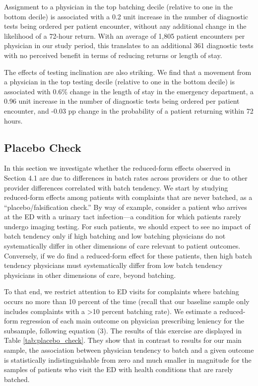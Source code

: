 \documentclass[,,nonblindrev]{informs}
\begin{document}
Assignment to a physician in the top batching decile (relative to one in
the bottom decile) is associated with a 0.2 unit increase in the number
of diagnostic tests being ordered per patient encounter, without any
additional change in the likelihood of a 72-hour return. With an average
of 1,805 patient encounters per physician in our study period, this
translates to an additional 361 diagnostic tests with no perceived
benefit in terms of reducing returns or length of stay.

The effects of testing inclination are also striking. We find that a
movement from a physician in the top testing decile (relative to one in
the bottom decile) is associated with 0.6\% change in the length of stay
in the emergency department, a 0.96 unit increase in the number of
diagnostic tests being ordered per patient encounter, and -0.03 pp
change in the probability of a patient returning within 72 hours.

\hypertarget{placebo-check}{%
\subsection{Placebo Check}\label{placebo-check}}

In this section we investigate whether the reduced-form effects observed
in Section 4.1 are due to differences in batch rates across providers or
due to other provider differences correlated with batch tendency. We
start by studying reduced-form effects among patients with complaints
that are never batched, as a ``placebo/falsification check.'' By way of
example, consider a patient who arrives at the ED with a urinary tact
infection---a condition for which patients rarely undergo imaging
testing. For such patients, we should expect to see no impact of batch
tendency only if high batching and low batching physicians do not
systematically differ in other dimensions of care relevant to patient
outcomes. Conversely, if we do find a reduced-form effect for these
patients, then high batch tendency physicians must systematically differ
from low batch tendency physicians in other dimensions of care, beyond
batching.

To that end, we restrict attention to ED visits for complaints where
batching occurs no more than 10 percent of the time (recall that our
baseline sample only includes complaints with a \textgreater10 percent
batching rate). We estimate a reduced-form regression of each main
outcome on physician prescribing leniency for the subsample, following
equation (3). The results of this exercise are displayed in Table
\ref{tab:placebo_check}. They show that in contrast to results for our
main sample, the association between physician tendency to batch and a
given outcome is statistically indistinguishable from zero and much
smaller in magnitude for the samples of patients who visit the ED with
health conditions that are rarely batched.
\end{document}
